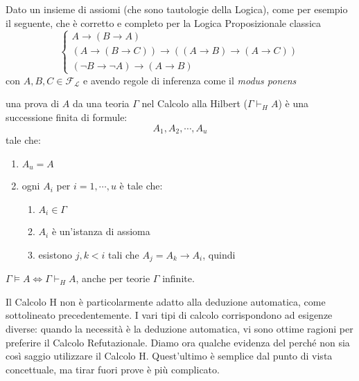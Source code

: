 \begin{defi}
        Dato un insieme di assiomi (che sono tautologie della Logica), come per esempio 
il seguente, che è corretto e completo per la Logica Proposizionale classica
$$
\begin{cases}
        A \rightarrow (B \rightarrow A) \\
        (A \rightarrow (B \rightarrow C)) \rightarrow ((A \rightarrow B) \rightarrow (A \rightarrow C)) \\
        ( \neg B \rightarrow \neg A) \rightarrow (A \rightarrow B) 
\end{cases}
$$
con $A, B, C \in \mathscr{F}_\mathscr{L}$ e avendo regole di inferenza come il \textit{modus ponens} 

\begin{prooftree}
\end{prooftree}

una prova di $A$ da una teoria $\Gamma$ nel Calcolo alla Hilbert ($\Gamma \vdash_H A$) è una successione finita di formule:
$$
A_1, A_2, \cdots, A_u
$$
tale che: 
\begin{enumerate}
  \item $A_u = A$ 
  \item ogni $A_i$ per $i = 1, \cdots, u$ è tale che: 
    \begin{enumerate}
      \item $A_i \in \Gamma$
      \item $A_i$ è un'istanza di assioma 
      \item esistono $j,k < i$ tali che $A_j= A_k \rightarrow A_i$, quindi 
        \begin{prooftree}
        \end{prooftree}
    \end{enumerate}
\end{enumerate}
\end{defi}

\begin{teo}
$\Gamma \models A \iff \Gamma \vdash_H A$, anche per teorie $\Gamma$ infinite. 
\end{teo}

Il Calcolo H non è particolarmente adatto alla deduzione automatica, come 
sottolineato precedentemente. I vari tipi di calcolo corrispondono ad esigenze 
diverse: quando la necessità è la deduzione automatica, vi sono ottime 
ragioni per preferire il Calcolo Refutazionale. Diamo ora qualche evidenza 
del perché non sia così saggio utilizzare il Calcolo H. Quest'ultimo è 
semplice dal punto di vista concettuale, ma tirar fuori prove è più complicato. 


